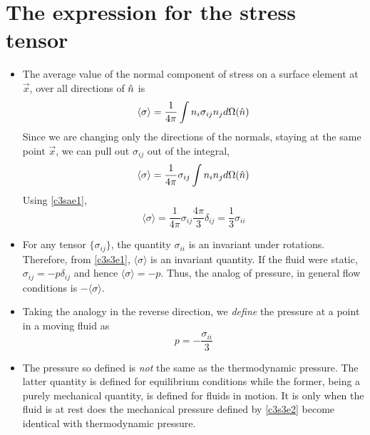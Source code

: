 \section{The expression for the stress tensor}\label{c3s3}
\begin{itemize}
\item The average value of the normal component of stress on a surface element at $\vec{x}$, over all directions of $\hat{n}$ is
\[
\langle\sigma\rangle = \frac{1}{4\pi}\int n_i\sigma_{ij}n_j d\Omega(\hat{n})
\]
Since we are changing only the directions of the normals, staying at the same point $\vec{x}$, we can pull out $\sigma_{ij}$ out of the integral,
\[
\langle\sigma\rangle = \frac{1}{4\pi}\sigma_{ij}\int n_i n_j d\Omega(\hat{n})
\]
Using \eqref{c3sae1},
\begin{equation}\label{c3s3e1}
\langle\sigma\rangle = \frac{1}{4\pi}\sigma_{ij}\frac{4\pi}{3}\delta_{ij} = \frac{1}{3}\sigma_{ii}
\end{equation}

\item For any tensor $\{\sigma_{ij}\}$, the quantity $\sigma_{ii}$ is an invariant under rotations. Therefore, from \eqref{c3s3e1}, $\langle\sigma\rangle$ is an invariant quantity. If
the fluid were static, $\sigma_{ij} = -p\delta_{ij}$ and hence $\langle\sigma\rangle = -p$. Thus, the analog of pressure, in general flow conditions is $-\langle\sigma\rangle$.

\item Taking the analogy in the reverse direction, we \emph{define} the pressure at a point in a moving fluid as
\begin{equation}\label{c3s3e2}
p = -\frac{\sigma_{ii}}{3}
\end{equation}

\item The pressure so defined is \emph{not} the same as the thermodynamic pressure. The latter quantity is defined for equilibrium conditions while the former, being a purely mechanical
quantity, is defined for fluids in motion. It is only when the fluid is at rest does the mechanical pressure defined by \eqref{c3s3e2} become identical with thermodynamic pressure.


\end{itemize}
